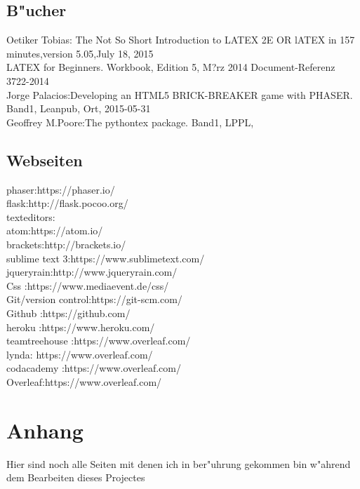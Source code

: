 \documentclass{article}
\begin{document}
\subsection{B"ucher}

Oetiker Tobias: The Not So Short Introduction to LATEX 2E OR lATEX in 157 minutes,version 5.05,July 18, 2015\\
                LATEX for Beginners. Workbook, Edition 5, M?rz 2014 Document-Referenz 3722-2014\\
Jorge Palacios:Developing an HTML5 BRICK-BREAKER game with PHASER. Band1, Leanpub, Ort, 2015-05-31\\
Geoffrey M.Poore:The pythontex package. Band1, LPPL,\\





\subsection{Webseiten}

phaser:https://phaser.io/\\
flask:http://flask.pocoo.org/\\
texteditors:\\
 atom:https://atom.io/\\
 brackets:http://brackets.io/\\
 sublime text 3:https://www.sublimetext.com/\\
jqueryrain:http://www.jqueryrain.com/\\
Css :https://www.mediaevent.de/css/\\
Git/version control:https://git-scm.com/\\
Github :https://github.com/\\
heroku :https://www.heroku.com/\\
teamtreehouse :https://www.overleaf.com/\\
lynda: https://www.overleaf.com/\\
codacademy :https://www.overleaf.com/\\
Overleaf:https://www.overleaf.com/\\










\cleardoublepage




\appendix
\section{Anhang}
Hier sind noch alle Seiten mit denen ich in ber"uhrung gekommen bin w"ahrend dem
Bearbeiten dieses Projectes\\
\end{document}
